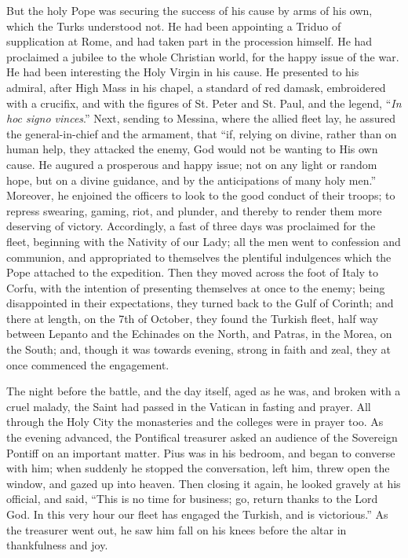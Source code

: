 But the holy Pope was securing
the success of his cause by arms of his own, which the Turks
understood not. He had been appointing a Triduo of supplication at
Rome, and had taken part in the procession himself. He had
proclaimed a jubilee to the whole Christian world, for the happy issue
of the war. He had been interesting the Holy Virgin in his cause. He
presented to his admiral, after High Mass in his chapel, a standard of
red damask, embroidered with a crucifix, and with the figures of St.
Peter and St. Paul, and the legend, ``\emph{In hoc signo vinces}.''
Next, sending to Messina, where the allied fleet lay, he assured the
general-in-chief and the armament, that ``if, relying on divine, rather
than on human help, they attacked the enemy, God would not be wanting
to His own cause. He augured a prosperous and happy issue; not on any
light or random hope, but on a divine guidance, and by the
anticipations of many holy men.'' Moreover, he enjoined the officers to
look to the good conduct of their troops; to repress swearing, gaming,
riot, and plunder, and thereby to render them more deserving of
victory. Accordingly, a fast of three days was proclaimed for the
fleet, beginning with the Nativity of our Lady; all the men went to
confession and communion, and appropriated to themselves the plentiful
indulgences which the Pope attached to the expedition. Then they moved
across the foot of Italy to Corfu, with the intention of presenting
themselves at once to the enemy; being disappointed in their
expectations, they turned back to the Gulf of Corinth; and there at
length, on the 7th of October, they found the Turkish fleet, half way
between Lepanto and the Echinades on the North, and Patras, in the
Morea, on the South; and, though it was towards evening, strong in
faith and zeal, they at once commenced the engagement.

The night before the battle,
and the day itself, aged as he was, and broken with a cruel malady,
the Saint had passed in the Vatican in fasting and prayer. All through the Holy City the monasteries and the colleges were in prayer
too. As the evening advanced, the Pontifical treasurer asked an
audience of the Sovereign Pontiff on an important matter. Pius was in
his bedroom, and began to converse with him; when suddenly he stopped
the conversation, left him, threw open the window, and gazed up into
heaven. Then closing it again, he looked gravely at his official, and
said, ``This is no time for business; go, return thanks to the Lord
God. In this very hour our fleet has engaged the Turkish, and is
victorious.'' As the treasurer went out, he saw him fall on his knees
before the altar in thankfulness and joy.

